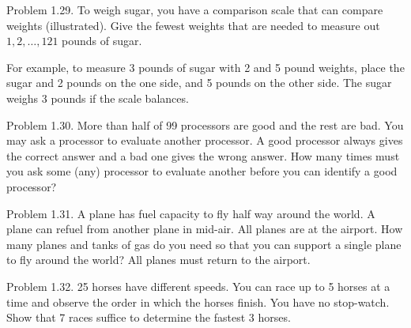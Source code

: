 \documentclass[10pt]{article}
\begin{document}
Problem 1.29. To weigh sugar, you have a comparison scale that can compare weights (illustrated). Give the fewest weights that are needed to measure out $1,2, \ldots, 121$ pounds of sugar.

For example, to measure 3 pounds of sugar with 2 and 5 pound weights, place the sugar and 2 pounds on the one side, and 5 pounds on the other side. The sugar weighs 3 pounds if the scale balances.


Problem 1.30. More than half of 99 processors are good and the rest are bad. You may ask a processor to evaluate another processor. A good processor always gives the correct answer and a bad one gives the wrong answer. How many times must you ask some (any) processor to evaluate another before you can identify a good processor?


Problem 1.31. A plane has fuel capacity to fly half way around the world. A plane can refuel from another plane in mid-air. All planes are at the airport. How many planes and tanks of gas do you need so that you can support a single plane to fly around the world? All planes must return to the airport.

Problem 1.32. 25 horses have different speeds. You can race up to 5 horses at a time and observe the order in which the horses finish. You have no stop-watch. Show that 7 races suffice to determine the fastest 3 horses.
\end{document}
